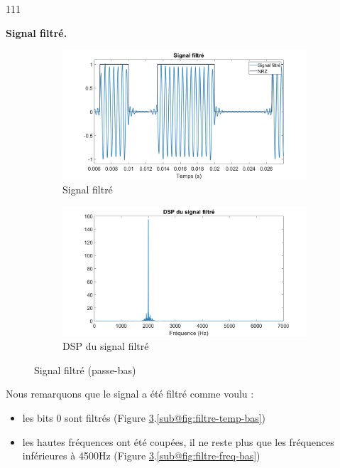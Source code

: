 \begin{dinglist}{111}
   \item \textbf{Signal filtré.}
   \begin{figure}[H]
      \centering
      \begin{subfigure}{0.5\textwidth}
         \centering
         \includegraphics[width=\textwidth]{partie-2/sous-partie-3/2.3.3.4.png}
         \caption{Signal filtré} \label{fig:filtre-temp-bas}
      \end{subfigure}%
      \begin{subfigure}{0.5\textwidth}
         \centering
         \includegraphics[width=\textwidth]{partie-2/sous-partie-3/2.3.3.5.png}
         \caption{DSP du signal filtré}\label{fig:filtre-freq-bas}
      \end{subfigure}
      \caption{Signal filtré (passe-bas)\label{fig:signal-filtre-bas}}
   \end{figure}
   Nous remarquons que le signal a été filtré comme voulu :
   \begin{itemize}
      \item les bits 0 sont filtrés (Figure \ref{fig:signal-filtre-bas}.\ref{sub@fig:filtre-temp-bas})
      \item les hautes fréquences ont été coupées, il ne reste plus que les fréquences inférieures à 4500Hz (Figure \ref{fig:signal-filtre-bas}.\ref{sub@fig:filtre-freq-bas})
   \end{itemize}
\end{dinglist}





